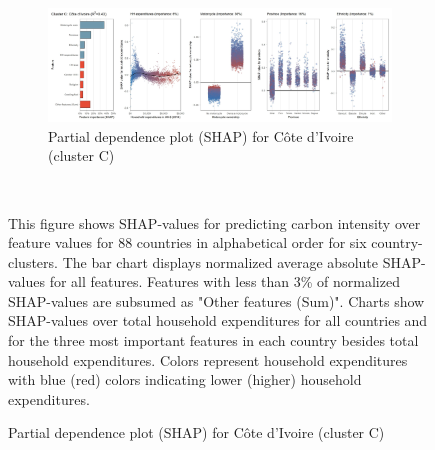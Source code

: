 \begin{figure}[ht!]
    \\
    \vspace{0.5cm}
   \begin{subfigure}[b]{\textwidth}    
   \centering
         \caption{Partial dependence plot (SHAP) for Côte d'Ivoire (cluster C)}
         \label{fig:5b_CIV}
         \includegraphics[width=\textwidth]{Figure 5b/Figure_5b_CIV}    
   \end{subfigure}
    \\
    \vspace{0.5cm}
   
    \begin{subcaption2}
     This figure shows SHAP-values for predicting carbon intensity over feature values for 88 countries in alphabetical order for six country-clusters. The bar chart displays normalized average absolute SHAP-values for all features. Features with less than 3\% of normalized SHAP-values are subsumed as "Other features (Sum)". Charts show SHAP-values over total household expenditures for all countries and for the three most important features in each country besides total household expenditures. Colors represent household expenditures with blue (red) colors indicating lower (higher) household expenditures.
     \end{subcaption2}
\end{figure}

